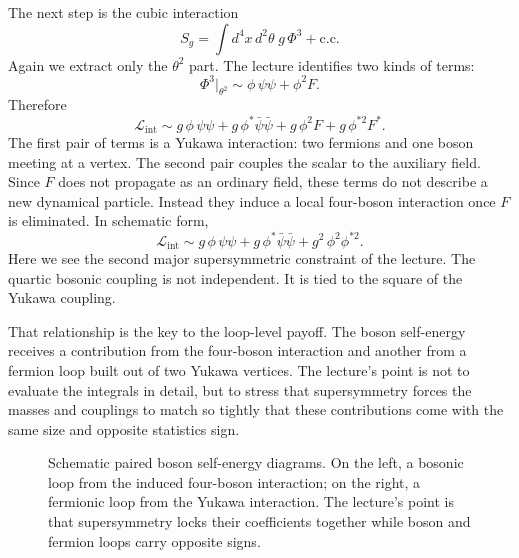 The next step is the cubic interaction
\begin{equation}
S_g=\int d^4x\,d^2\theta\;g\,\Phi^3+\mathrm{c.c.}
\end{equation}
Again we extract only the \(\theta^2\) part. The lecture identifies two kinds of terms:
\begin{equation}
\Phi^3\big|_{\theta^2}\sim \phi\,\psi\psi + \phi^2 F.
\end{equation}
Therefore
\begin{equation}
\mathcal L_{\mathrm{int}}
\sim
g\,\phi\,\psi\psi
+
g\,\phi^\ast \bar\psi\bar\psi
+
g\,\phi^2 F
+
g\,\phi^{\ast 2}F^\ast.
\end{equation}
The first pair of terms is a Yukawa interaction: two fermions and one boson meeting at a vertex. The second pair couples the scalar to the auxiliary field. Since \(F\) does not propagate as an ordinary field, these terms do not describe a new dynamical particle. Instead they induce a local four-boson interaction once \(F\) is eliminated. In schematic form,
\begin{equation}
\mathcal L_{\mathrm{int}}
\sim
g\,\phi\,\psi\psi
+
g\,\phi^\ast \bar\psi\bar\psi
+
g^2\,\phi^2\phi^{\ast 2}.
\end{equation}
Here we see the second major supersymmetric constraint of the lecture. The quartic bosonic coupling is not independent. It is tied to the square of the Yukawa coupling.

That relationship is the key to the loop-level payoff. The boson self-energy receives a contribution from the four-boson interaction and another from a fermion loop built out of two Yukawa vertices. The lecture's point is not to evaluate the integrals in detail, but to stress that supersymmetry forces the masses and couplings to match so tightly that these contributions come with the same size and opposite statistics sign.

\begin{figure}
\centering
{}
\qquad
{}
\caption{Schematic paired boson self-energy diagrams. On the left, a bosonic loop from the induced four-boson interaction; on the right, a fermionic loop from the Yukawa interaction. The lecture's point is that supersymmetry locks their coefficients together while boson and fermion loops carry opposite signs.}
\end{figure}


